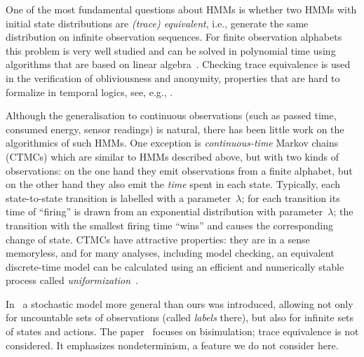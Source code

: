 \documentclass[a4paper,UKenglish,cleveref, autoref,mathscr]{lipics-v2019}
\newcommand{\1}{\mathbbm{1}}
\begin{document}
One of the most fundamental questions about HMMs is whether two HMMs with initial state distributions are \emph{(trace) equivalent}, i.e., generate the same distribution on infinite observation sequences.
For finite observation alphabets this problem is very well studied and can be solved in polynomial time using algorithms that are based on linear algebra~\cite{schut61,Paz71,Tzeng92,CortesMRdistance}.
Checking trace equivalence is used in the verification of obliviousness and anonymity, properties that are hard to formalize in temporal logics, see, e.g., \cite{EquivForSecurity10,kief11,ModVerif17}.

Although the generalisation to continuous observations (such as passed time, consumed energy, sensor readings) is natural, there has been little work on the algorithmics of such HMMs.
One exception is \emph{continuous-time} Markov chains (CTMCs) \cite{BHHK03,CDKM11} which are similar to HMMs described above, but with two kinds of observations: on the one hand they emit observations from a finite alphabet, but on the other hand they also emit the \emph{time} spent in each state. Typically, each state-to-state transition is labelled with a parameter~$\lambda$; for each transition its time of ``firing'' is drawn from an exponential distribution with parameter~$\lambda$; the transition with the smallest firing time ``wins'' and causes the corresponding change of state.
CTMCs have attractive properties: they are in a sense memoryless, and for many analyses, including model checking, an equivalent discrete-time model can be calculated using an efficient and numerically stable process called \emph{uniformization}~\cite{Grassmann91}.

In~\cite{HKK14} a stochastic model more general than ours was introduced, allowing not only for uncountable sets of observations (called \emph{labels} there), but also for infinite sets of states and actions.
The paper~\cite{HKK14} focuses on bisimulation; trace equivalence is not considered.
It emphasizes nondeterminism, a feature we do not consider here.
\end{document}
